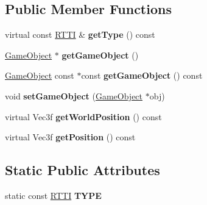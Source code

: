 \subsection*{Public Member Functions}
\begin{DoxyCompactItemize}
\item 
\hypertarget{class_component_aabc486387d1bbf40f98073e45e6e07b6}{
virtual const \hyperlink{class_r_t_t_i}{RTTI} \& {\bfseries getType} () const }
\label{class_component_aabc486387d1bbf40f98073e45e6e07b6}

\item 
\hypertarget{class_component_abed36db99f1ee0ba84a5fb8485e17428}{
\hyperlink{class_game_object}{GameObject} $\ast$ {\bfseries getGameObject} ()}
\label{class_component_abed36db99f1ee0ba84a5fb8485e17428}

\item 
\hypertarget{class_component_adde518ad6b8f7c51e664fc5a03123f37}{
\hyperlink{class_game_object}{GameObject} const $\ast$const {\bfseries getGameObject} () const }
\label{class_component_adde518ad6b8f7c51e664fc5a03123f37}

\item 
\hypertarget{class_component_a79a940a4c0e948e220c01737efa318de}{
void {\bfseries setGameObject} (\hyperlink{class_game_object}{GameObject} $\ast$obj)}
\label{class_component_a79a940a4c0e948e220c01737efa318de}

\item 
\hypertarget{class_component_ae37c972b61785a3f00604300eb1bcef5}{
virtual Vec3f {\bfseries getWorldPosition} () const }
\label{class_component_ae37c972b61785a3f00604300eb1bcef5}

\item 
\hypertarget{class_component_a68cb3bbdba66799f5a0f4b9b4063fc25}{
virtual Vec3f {\bfseries getPosition} () const }
\label{class_component_a68cb3bbdba66799f5a0f4b9b4063fc25}

\end{DoxyCompactItemize}
\subsection*{Static Public Attributes}
\begin{DoxyCompactItemize}
\item 
\hypertarget{class_component_ac06bcbdc3e5e24713d90276a7df3c6f7}{
static const \hyperlink{class_r_t_t_i}{RTTI} {\bfseries TYPE}}
\label{class_component_ac06bcbdc3e5e24713d90276a7df3c6f7}

\end{DoxyCompactItemize}
